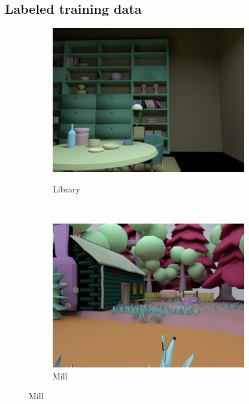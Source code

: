 \documentclass{jov}
\begin{document}
\subsection{Labeled training data} \label{method:VirtualWorld}
\begin{figure}[t]
\centering
\begin{subfigure}[b]{0.22 \textwidth}
        \caption{Library }
        \includegraphics[width=\textwidth]{../Figures/Figure3/Figure3_a.png}
        \label{fig:baseSceneLibrary}
    \end{subfigure}
    ~
    \begin{subfigure}[b]{0.22 \textwidth}
        \caption{Mill}    
        \includegraphics[width=\textwidth]{../Figures/Figure3/Figure3_b.png}

\end{subfigure}
\end{figure}
\end{document}
